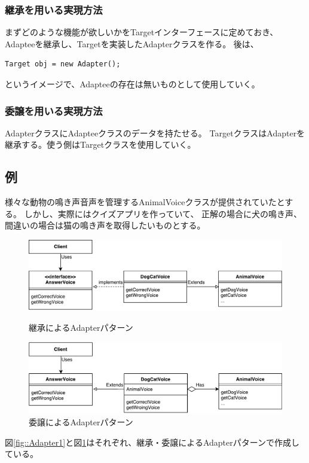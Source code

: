 \documentclass[11pt]{jsarticle}
\begin{document}
			\subsubsection{継承を用いる実現方法}
				まずどのような機能が欲しいかをTargetインターフェースに定めておき、
				Adapteeを継承し、Targetを実装したAdapterクラスを作る。
				後は、
				\begin{lstlisting}[basicstyle=\ttfamily\scriptsize, frame=single] 
Target obj = new Adapter();
				\end{lstlisting}
				というイメージで、Adapteeの存在は無いものとして使用していく。
				
			\subsubsection{委譲を用いる実現方法}\label{sec::adapter1}
				AdapterクラスにAdapteeクラスのデータを持たせる。
				TargetクラスはAdapterを継承する。使う側はTargetクラスを使用していく。
		\subsection{例}\label{sub::adapter1}
			様々な動物の鳴き声音声を管理するAnimalVoiceクラスが提供されていたとする。
			しかし、実際にはクイズアプリを作っていて、
			正解の場合に犬の鳴き声、間違いの場合は猫の鳴き声を取得したいものとする。
			
			\begin{figure}[htbp]
				\centering
				\includegraphics[width = 0.8\hsize]{AdapterPattern1.pdf}
				\caption{継承によるAdapterパターン}\label{fig::Adapter1}
				
				\includegraphics[width = 0.8\hsize]{AdapterPattern2.pdf}
				\caption{委譲によるAdapterパターン}\label{fig::Adapter2}
			\end{figure}
			
			図\ref{fig::Adapter1}と図\ref{fig::Adapter2}はそれぞれ、継承・委譲によるAdapterパターンで作成している。
			
\end{document}
